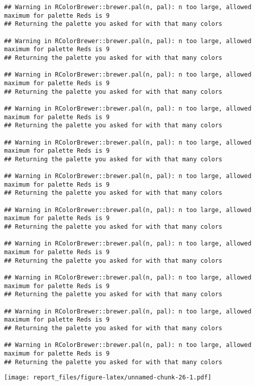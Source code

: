 \documentclass[
]{article}
\begin{document}
\begin{verbatim}
## Warning in RColorBrewer::brewer.pal(n, pal): n too large, allowed maximum for palette Reds is 9
## Returning the palette you asked for with that many colors

## Warning in RColorBrewer::brewer.pal(n, pal): n too large, allowed maximum for palette Reds is 9
## Returning the palette you asked for with that many colors

## Warning in RColorBrewer::brewer.pal(n, pal): n too large, allowed maximum for palette Reds is 9
## Returning the palette you asked for with that many colors

## Warning in RColorBrewer::brewer.pal(n, pal): n too large, allowed maximum for palette Reds is 9
## Returning the palette you asked for with that many colors

## Warning in RColorBrewer::brewer.pal(n, pal): n too large, allowed maximum for palette Reds is 9
## Returning the palette you asked for with that many colors

## Warning in RColorBrewer::brewer.pal(n, pal): n too large, allowed maximum for palette Reds is 9
## Returning the palette you asked for with that many colors

## Warning in RColorBrewer::brewer.pal(n, pal): n too large, allowed maximum for palette Reds is 9
## Returning the palette you asked for with that many colors

## Warning in RColorBrewer::brewer.pal(n, pal): n too large, allowed maximum for palette Reds is 9
## Returning the palette you asked for with that many colors

## Warning in RColorBrewer::brewer.pal(n, pal): n too large, allowed maximum for palette Reds is 9
## Returning the palette you asked for with that many colors

## Warning in RColorBrewer::brewer.pal(n, pal): n too large, allowed maximum for palette Reds is 9
## Returning the palette you asked for with that many colors

## Warning in RColorBrewer::brewer.pal(n, pal): n too large, allowed maximum for palette Reds is 9
## Returning the palette you asked for with that many colors
\end{verbatim}

\texttt{[image: report\_files/figure-latex/unnamed-chunk-26-1.pdf]}
\end{document}
